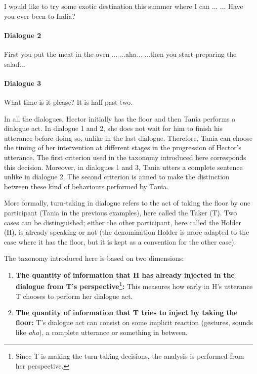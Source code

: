         \begin{dialogue}
           I would like to try some exotic destination this summer where I can ...
           ... Have you ever been to India?
        \end{dialogue}

        \paragraph{Dialogue 2}

        \begin{dialogue}
           First you put the meat in the oven ...
           ...aha...
           ...then you start preparing the salad...
        \end{dialogue}

        \paragraph{Dialogue 3}

        \begin{dialogue}
           What time is it please?
           It is half past two.
        \end{dialogue}

        In all the dialogues, Hector initially has the floor and then Tania performs a dialogue act. In dialogue 1 and 2, she does not wait for him to finish his utterance before doing so, unlike in the last dialogue. Therefore, Tania can choose the timing of her intervention at different stages in the progression of Hector's utterance. The first criterion used in the taxonomy introduced here corresponds this decision. Moreover, in dialogues 1 and 3, Tania utters a complete sentence unlike in dialogue 2. The second criterion is aimed to make the distinction between these kind of behaviours performed by Tania.

	More formally, turn-taking in dialogue refers to the act of taking the floor by one participant (Tania in the previous examples), here called the Taker (T). Two cases can be distinguished; either the other participant, here called the Holder (H), is already speaking or not (the denomination Holder is more adapted to the case where it has the floor, but it is kept as a convention for the other case).
    
    The taxonomy introduced here is based on two dimensions:

    \begin{enumerate}
      \item \textbf{The quantity of information that H has already injected in the dialogue from T's perspective\footnote{Since T is making the turn-taking decisions, the analysis is performed from her perspective.}:} This measures how early in H's utterance T chooses to perform her dialogue act.
      \item \textbf{The quantity of information that T tries to inject by taking the floor:} T's dialogue act can consist on some implicit reaction (gestures, sounds like \textit{aha}), a complete utterance or something in between.
    \end{enumerate}

